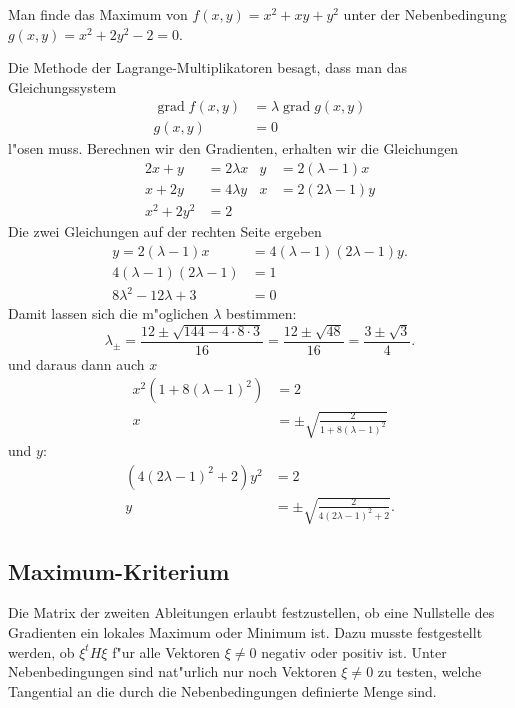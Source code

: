 \begin{beispiel}
Man finde das Maximum von $f(x,y)=x^2 + xy + y^2$ unter der Nebenbedingung
$g(x,y)=x^2+2y^2-2=0$.

Die Methode der Lagrange-Multiplikatoren besagt, dass man das Gleichungssystem
\begin{align*}
\operatorname{grad}f(x,y)&=\lambda\operatorname{grad}g(x,y)\\
g(x,y)&=0
\end{align*}
l"osen muss. Berechnen wir den Gradienten, erhalten wir die
Gleichungen
\begin{align*}
2x+y &=2\lambda x& y&=2(\lambda-1)x\\
x+2y&=4\lambda y& x&=2(2\lambda -1)y\\
x^2+2y^2&=2
\end{align*}
Die zwei Gleichungen auf der rechten Seite ergeben
\begin{align*}
y=2(\lambda-1)x&=4(\lambda-1)(2\lambda-1)y.
\\
4(\lambda-1)(2\lambda-1)&=1
\\
8\lambda^2-12\lambda+3&=0
\end{align*}
Damit lassen sich die m"oglichen $\lambda$ bestimmen:
\[
\lambda_{\pm}=\frac{12\pm\sqrt{144-4\cdot 8\cdot 3}}{16}
=\frac{12\pm\sqrt{48}}{16}
=\frac{3\pm\sqrt{3}}{4}.
\]
und daraus dann auch $x$
\begin{align*}
x^2(1+8(\lambda-1)^2)&=2
\\
x&=\pm\sqrt{
\frac{2}{1+8(\lambda-1)^2}}
\end{align*}
und $y$:
\begin{align*}
(4(2\lambda-1)^2+2)y^2&=2\\
y&=\pm\sqrt{\frac{2}{4(2\lambda-1)^2+2}}.
\end{align*}
\end{beispiel}

\subsection{Maximum-Kriterium\label{nlp:nebenbedingungen:maximumkriterium}}
Die Matrix der zweiten Ableitungen erlaubt festzustellen, ob eine
Nullstelle des Gradienten ein lokales Maximum oder Minimum ist.
Dazu musste festgestellt werden, ob $\xi^tH\xi$ f"ur alle Vektoren
$\xi\ne 0$ negativ oder positiv ist. 
Unter Nebenbedingungen sind nat"urlich nur noch Vektoren $\xi\ne 0$
zu testen, welche Tangential an die durch die Nebenbedingungen
definierte Menge sind.


